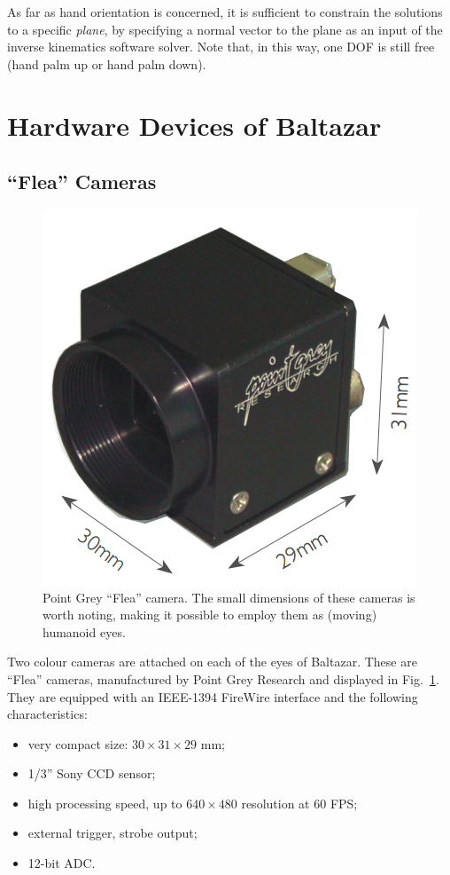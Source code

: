 As far as hand orientation is concerned, it is sufficient to constrain the solutions to a specific \emph{plane}, by specifying a normal vector to the plane as an input of the inverse kinematics software solver. Note that, in this way, one \ac{DOF} is still free (hand palm up or hand palm down).

\section{Hardware Devices of Baltazar}

\subsection{``Flea'' Cameras}

\begin{figure}
\centering
\includegraphics[scale=0.4]{figures/flea}
\caption[Point Grey ``Flea'' camera]{Point Grey ``Flea'' camera. The small dimensions of these cameras is worth noting, making it possible to employ them as (moving) humanoid eyes.}
\label{img:flea}
\end{figure}

Two colour cameras are attached on each of the eyes of Baltazar. These are ``Flea'' cameras, manufactured by Point Grey Research and displayed in Fig.~\ref{img:flea}. They are equipped with an IEEE-1394 FireWire interface and the following characteristics:
\begin{itemize}
\item very compact size: $30 \times 31 \times 29$ mm;

\item 1/3'' Sony \ac{CCD} sensor;

\item high processing speed, up to $640 \times 480$ resolution at 60 \ac{FPS};

\item external trigger, strobe output;

\item 12-bit \ac{ADC}.
\end{itemize}


